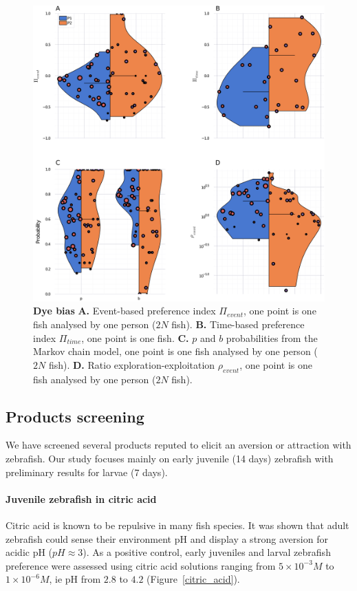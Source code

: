     \begin{figure}[H]
      \centering
      \includegraphics[width=1\textwidth]{part_2/assets/dye_pi.png}
      \caption{\textbf{Dye bias} \textbf{A.} Event-based preference index $\Pi_{event}$, one point is one fish analysed by one person ($2N$ fish). \textbf{B.} Time-based preference index $\Pi_{time}$, one point is one fish. \textbf{C.} $p$ and $b$ probabilities from the Markov chain model, one point is one fish analysed by one person ($2N$ fish). \textbf{D.} Ratio exploration-exploitation $\rho_{event}$, one point is one fish analysed by one person ($2N$ fish).}
      \label{dye_bias}
    \end{figure}

  \subsection{Products screening}
  We have screened several products reputed to elicit an aversion or attraction with zebrafish. Our study focuses mainly on early juvenile (14 days) zebrafish with preliminary results for larvae (7 days).

  \paragraph{Juvenile zebrafish in citric acid}
  Citric acid is known to be repulsive in many fish species. It was shown that adult zebrafish could sense their environment pH \cite{abreu2016acute,abreu2016behavioral} and display a strong aversion for acidic pH ($pH \approx 3$). As a positive control, early juveniles and larval zebrafish preference were assessed using citric acid solutions ranging from $5 \times 10^{-3} M$ to $1 \times 10^{-6} M$, ie pH from $2.8$ to $4.2$ (Figure~\ref{citric_acid}).

